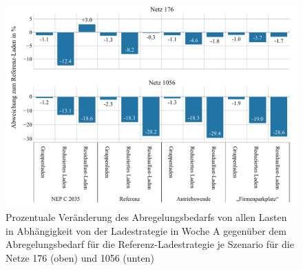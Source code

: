 \begin{figure}[H]
    \centering
    \includegraphics[width=\textwidth]{Bilder/176_1056_cur_load_grid_week_A}
    \caption{Prozentuale Veränderung des Abregelungsbedarfs von allen Lasten in Abhängigkeit von der Ladestrategie in Woche A gegenüber dem Abregelungsbedarf für die Referenz-Ladestrategie je Szenario für die Netze \num{176} (oben) und \num{1056} (unten)}\label{fig:176_1056_cur_load_grid_week_A}
\end{figure}